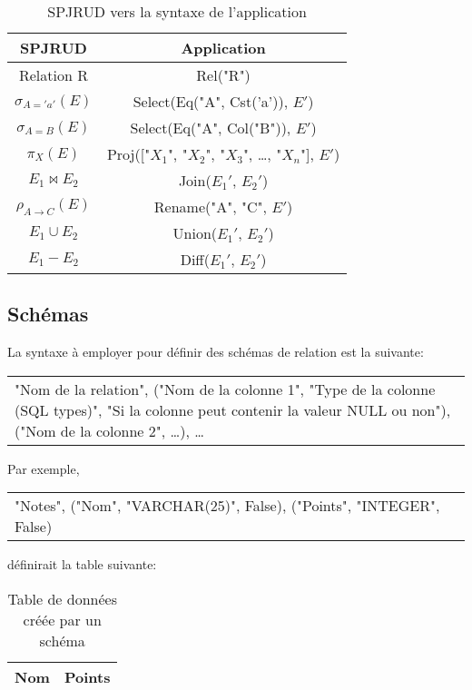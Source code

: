 \documentclass[]{article}
\begin{document}
\begin{table}[H]
	\centering
	\begin{tabular}{| c | c |}
		\hline
		\textbf{SPJRUD} & \textbf{Application}\\
		\hline
		Relation R & Rel("R")\\
		\hline
		$\sigma_{A='a'}(E)$ & Select(Eq("A", Cst('a')), $E'$)\\
		\hline
		$\sigma_{A=B}(E)$ & Select(Eq("A", Col("B")), $E'$)\\
		\hline
		$\pi_{X}(E)$ & Proj(["$X_1$", "$X_2$", "$X_3$", \ldots, "$X_n$"], $E'$)\\
		\hline
		$E_1 \bowtie E_2$ & Join($E_1'$, $E_2'$)\\
		\hline
		$\rho_{A \to C}(E)$ & Rename("A", "C", $E'$)\\
		\hline
		$E_1 \cup E_2$ & Union($E_1'$, $E_2'$)\\
		\hline
		$E_1 - E_2$ & Diff($E_1'$, $E_2'$)\\
		\hline
	\end{tabular}
	\caption{SPJRUD vers la syntaxe de l'application}
\end{table}

\subsection{Sch\'emas}
La syntaxe \`a employer pour d\'efinir des sch\'emas de relation est la suivante:

\begin{center}
	\begin{tabular}{p{250px}}
		"Nom de la relation", ("Nom de la colonne 1", "Type de la colonne (SQL types)", "Si la colonne peut contenir la valeur NULL ou non"), ("Nom de la colonne 2", \ldots), \ldots
	\end{tabular}
\end{center}

Par exemple,
\begin{center}
	\begin{tabular}{p{250px}}
		"Notes", ("Nom", "VARCHAR(25)", False), ("Points", "INTEGER", False)
	\end{tabular}
\end{center}

d\'efinirait la table suivante:
\begin{table}[H]
	\centering
	\begin{tabular}{| c | c |}
		\hline
		\textbf{Nom} & \textbf{Points}\\
		\hline
	\end{tabular}
	\caption{Table de donn\'ees cr\'e\'ee par un sch\'ema}
\end{table}
\end{document}
